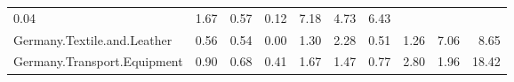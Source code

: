 \documentclass[a4paper]{article}\usepackage[]{graphicx}\usepackage[]{color}
\providecommand{\tabularnewline}{\\}
\begin{document}
\begin{sidewaystable}
\begin{tabular}{lrrrrrrrrr}
{\scriptsize{}0.04 } &
{\scriptsize{}1.67 } &
{\scriptsize{}0.57 } &
{\scriptsize{}0.12 } &
{\scriptsize{}7.18 } &
{\scriptsize{}4.73 } &
{\scriptsize{}6.43 }\tabularnewline
{\scriptsize{}Germany.Textile.and.Leather } &
{\scriptsize{}0.56 } &
{\scriptsize{}0.54 } &
{\scriptsize{}0.00 } &
{\scriptsize{}1.30 } &
{\scriptsize{}2.28 } &
{\scriptsize{}0.51 } &
{\scriptsize{}1.26 } &
{\scriptsize{}7.06 } &
{\scriptsize{}8.65 }\tabularnewline
{\scriptsize{}Germany.Transport.Equipment } &
{\scriptsize{}0.90 } &
{\scriptsize{}0.68 } &
{\scriptsize{}0.41 } &
{\scriptsize{}1.67 } &
{\scriptsize{}1.47 } &
{\scriptsize{}0.77 } &
{\scriptsize{}2.80 } &
{\scriptsize{}1.96 } &
{\scriptsize{}18.42 }\tabularnewline
\hline 
\end{tabular}{\scriptsize \par}

{\scriptsize{}\bigskip{}
\bigskip{}
\bigskip{}
}{\scriptsize \par}


\end{sidewaystable}
\end{document}

